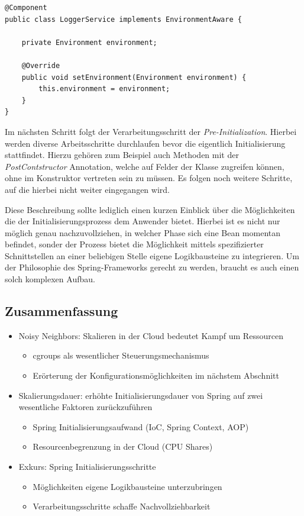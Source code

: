 \begin{lstlisting}[style=javaStyle,caption={Bean - EnvironmentAware \cite{bean-aware}},label=lst:bean-aware]
@Component
public class LoggerService implements EnvironmentAware {

	private Environment environment;

	@Override
	public void setEnvironment(Environment environment) {
		this.environment = environment;
	}
}
\end{lstlisting}

Im nächsten Schritt folgt der Verarbeitungsschritt der \emph{Pre-Initialization}. Hierbei werden diverse Arbeitsschritte durchlaufen bevor die eigentlich Initialisierung stattfindet. Hierzu gehören zum Beispiel auch Methoden mit der \emph{PostContstructor} Annotation, welche auf Felder der Klasse zugreifen können, ohne im Konstruktor vertreten sein zu müssen. Es folgen noch weitere Schritte, auf die hierbei nicht weiter eingegangen wird. 

Diese Beschreibung sollte lediglich einen kurzen Einblick über die Möglichkeiten die der Initialisierungsprozess dem Anwender bietet. Hierbei ist es nicht nur möglich genau nachzuvollziehen, in welcher Phase sich eine Bean momentan befindet, sonder der Prozess bietet die Möglichkeit mittels spezifizierter Schnittstellen an einer beliebigen Stelle eigene Logikbausteine zu integrieren. Um der Philosophie des Spring-Frameworks gerecht zu werden, braucht es auch einen solch komplexen Aufbau. 


\subsection{Zusammenfassung}

\begin{itemize}
	\item Noisy Neighbors: Skalieren in der Cloud bedeutet Kampf um Ressourcen
	\begin{itemize}
		\item cgroups als wesentlicher Steuerungsmechanismus
		\item Erörterung der Konfigurationsmöglichkeiten im nächstem Abschnitt
	\end{itemize}
	\item Skalierungsdauer: erhöhte Initialisierungsdauer von Spring auf zwei wesentliche Faktoren zurückzuführen
	\begin{itemize}
		\item Spring Initialisierungsaufwand (IoC, Spring Context, AOP)
		\item Resourcenbegrenzung in der Cloud (CPU Shares)
	\end{itemize}
	\item Exkurs: Spring Initialisierungsschritte
	\begin{itemize}
		\item Möglichkeiten eigene Logikbausteine unterzubringen
		\item Verarbeitungsschritte schaffe Nachvollziehbarkeit
	\end{itemize}
\end{itemize}


